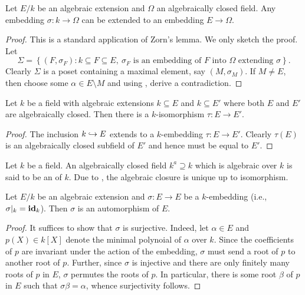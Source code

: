 \begin{lemma}
    Let $E/k$ be an algebraic extension and $\Omega$ an algebraically closed field. Any embedding $\sigma\colon k\to\Omega$ can be extended to an embedding $E\to \Omega$.
\end{lemma}
\begin{proof}
    This is a standard application of Zorn's lemma. We only sketch the proof. Let 
    \begin{equation*}
        \Sigma = \left\{(F,\sigma_F)\colon k\subseteq F\subseteq E,~\sigma_F\text{ is an embedding of $F$ into $\Omega$ extending $\sigma$}\right\}.
    \end{equation*}
    Clearly $\Sigma$ is a poset containing a maximal element, say $(M,\sigma_M)$. If $M\ne E$, then choose some $\alpha\in E\setminus M$ and using , derive a contradiction.
\end{proof}

\begin{corollary}
    Let $k$ be a field with algebraic extensions $k\subseteq E$ and $k\subseteq E'$ where both $E$ and $E'$ are algebraically closed. Then there is a $k$-isomorphism $\tau\colon E\to E'$.
\end{corollary}
\begin{proof}
    The inclusion $k\hookrightarrow E$ extends to a $k$-embedding $\tau\colon E\to E'$. Clearly $\tau(E)$ is an algebraically closed subfield of $E'$ and hence must be equal to $E'$.
\end{proof}

\begin{definition}
    Let $k$ be a field. An algebraically closed field $k^a\supseteq k$ which is algebraic over $k$ is said to be an  of $k$. Due to , the algebraic closure is unique up to isomorphism.
\end{definition}

\begin{proposition}
    Let $E/k$ be an algebraic extension and $\sigma\colon E\to E$ be a $k$-embedding (i.e., $\sigma|_k = \mathbf{id}_k$). Then $\sigma$ is an automorphism of $E$.
\end{proposition}
\begin{proof}
    It suffices to show that $\sigma$ is surjective. Indeed, let $\alpha\in E$ and $p(X)\in k[X]$ denote the minimal polynoial of $\alpha$ over $k$. Since the coefficients of $p$ are invariant under the action of the embedding, $\sigma$ must send a root of $p$ to another root of $p$. Further, since $\sigma$ is injective and there are only finitely many roots of $p$ in $E$, $\sigma$ permutes the roots of $p$. In particular, there is some root $\beta$ of $p$ in $E$ such that $\sigma\beta = \alpha$, whence surjectivity follows.
\end{proof}


